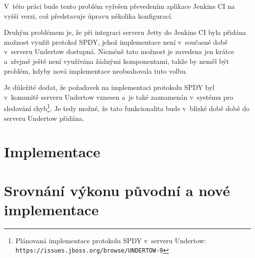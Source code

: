             V~této práci bude tento problém vyřešen převedením aplikace Jenkins CI na vyšší verzi,
            což představuje úpravu několika konfigurací.

            \medskip        
            Druhým problémem je, že při integraci serveru Jetty do Jenkins CI byla přidána
            možnost využít protokol SPDY, jehož implementace
            není v~současné době v~serveru Undertow dostupná. Nicméně tato možnost
            je zavedena jen krátce a~zřejmě ještě není využívána žádnými komponentami,
            takže by neměl být problém, kdyby nová implementace neobsahovala tuto volbu.
            
            Je důležité dodat, že požadavek na implementaci 
            protokolu SPDY byl v~komunitě serveru Undertow vznesen
            a~je také zaznamenán v~systému pro sledování chyb\footnote{
                Plánovaná implementace protokolu SPDY v~serveru Undertow:
                \texttt{https://issues.jboss.org/browse/UNDERTOW-9}}.
            Je tedy možné, že tato funkcionalita bude v~blízké době době do serveru
            Undertow přidána.
            



    \section{Implementace}


    \section{Srovnání výkonu původní a nové implementace}  \label{kapPerformance}




